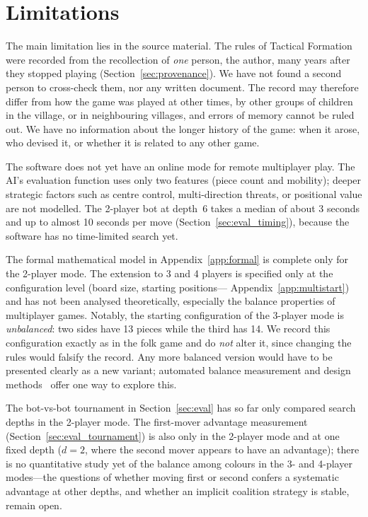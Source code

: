 \section{Limitations}
\label{sec:limitations}

The main limitation lies in the source material. The rules of Tactical Formation were
recorded from the recollection of \emph{one} person, the author, many years
after they stopped playing (Section~\ref{sec:provenance}). We have not found
a second person to cross-check them, nor any written document. The record
may therefore differ from how the game was played at other times, by other
groups of children in the village, or in neighbouring villages, and errors of
memory cannot be ruled out. We have no information about the longer history
of the game: when it arose, who devised it, or whether it is related to any
other game.

The software does not yet have an online mode for remote multiplayer play.
The AI's evaluation function uses only two features (piece count and
mobility); deeper strategic factors such as centre control, multi-direction
threats, or positional value are not modelled. The 2-player bot at depth~6
takes a median of about 3 seconds and up to almost 10 seconds per move
(Section~\ref{sec:eval_timing}), because the software has no time-limited
search yet.

The formal mathematical model in Appendix~\ref{app:formal} is complete only
for the 2-player mode. The extension to 3 and 4 players is specified only at
the configuration level (board size, starting positions---%
Appendix~\ref{app:multistart}) and has not been analysed theoretically,
especially the balance properties of multiplayer games. Notably, the
starting configuration of the 3-player mode is \emph{unbalanced}: two sides
have 13 pieces while the third has 14. We record this configuration exactly
as in the folk game and do \emph{not} alter it, since changing the rules
would falsify the record. Any more balanced version would have to be
presented clearly as a new variant; automated balance measurement and design
methods~\citep{hommarks2007balanced} offer one way to explore this.

The bot-vs-bot tournament in Section~\ref{sec:eval} has so far only compared
search depths in the 2-player mode. The first-mover advantage measurement
(Section~\ref{sec:eval_tournament}) is also only in the 2-player mode and at
one fixed depth ($d{=}2$, where the second mover appears to have an
advantage); there is no quantitative study yet of the balance among colours
in the 3- and 4-player modes---the questions of whether moving first or
second confers a systematic advantage at other depths, and whether an
implicit coalition strategy is stable, remain open.

